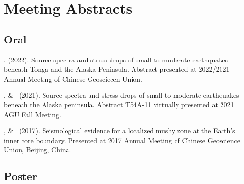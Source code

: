\section{Meeting Abstracts}

\subsection{Oral}

\begin{etaremune}
\item \Me. (2022).
	Source spectra and stress drops of small-to-moderate earthquakes beneath Tonga and the Alaska Peninsula.
	Abstract presented at 2022/2021 Annual Meeting of Chinese Geosciecen Union.
\item \Me, \& \SWei\ (2021).
    Source spectra and stress drops of small-to-moderate earthquakes beneath the Alaska peninsula.
    Abstract T54A-11 virtually presented at 2021 AGU Fall Meeting.
\item
    \Me, \& \LWen\ (2017).
    Seismological evidence for a localized mushy zone at the Earth's inner core boundary.
    Presented at 2017 Annual Meeting of Chinese Geoscience Union, Beijing, China.
\end{etaremune}

\subsection{Poster}

